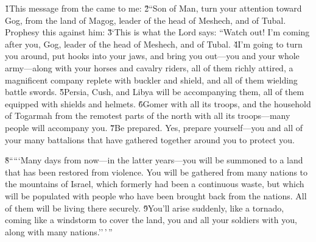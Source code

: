 \v{1}This message from the  came to me: \v{2}``Son of Man, turn your attention toward Gog, from the land of Magog, leader of the head of Meshech, and of Tubal. Prophesy this against him: \v{3}`This is what the Lord  says: ``Watch out! I'm coming after you, Gog, leader of the head of Meshech, and of Tubal. \v{4}I'm going to turn you around, put hooks into your jaws, and bring you out---you and your whole army---along with your horses and cavalry riders, all of them richly attired, a magnificent company replete with buckler and shield, and all of them wielding battle swords. \v{5}Persia, Cush, and Libya will be accompanying them, all of them equipped with shields and helmets. \v{6}Gomer with all its troops, and the household of Togarmah from the remotest parts of the north with all its troops---many people will accompany you. \v{7}Be prepared. Yes, prepare yourself---you and all of your many battalions that have gathered together around you to protect you.

\v{8}`````Many days from now---in the latter years---you will be summoned to a land that has been restored from violence. You will be gathered from many nations to the mountains of Israel, which formerly had been a continuous waste, but which will be populated with people who have been brought back from the nations. All of them will be living there securely. \v{9}You'll arise suddenly, like a tornado, coming like a windstorm to cover the land, you and all your soldiers with you, along with many nations.''\,'\,''

